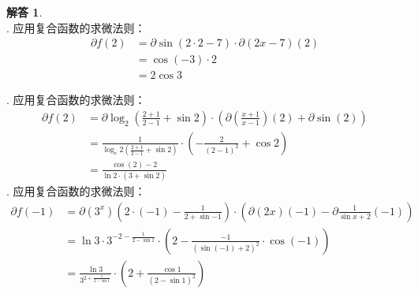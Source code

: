 \documentclass[12pt,UTF8]{ctexbook}
\theoremstyle{definition}
\newtheorem*{so}{解答}
\theoremstyle{plain}
\begin{document}
\begin{so}
    \mbox{} \\
    . 应用复合函数的求微法则：
    \begin{align*}
        \partial f(2) &= \partial \sin (2 \cdot 2 - 7) \cdot \partial (2x - 7) (2)  \\
        &= \cos{(-3)} \cdot 2  \\
        &= 2 \cos{3}   
    \end{align*}
    
    . 应用复合函数的求微法则：
    \begin{align*}
        \partial f(2) &= \partial \log_2 \left(\frac{2+1}{2-1} + \sin{2}\right) \cdot \left(\partial \left(\frac{x+1}{x-1}\right) (2) + \partial \sin (2) \right) \\
        &= \frac{1}{\log_e{2} \left(\frac{2+1}{2-1} + \sin{2}\right)} \cdot \left( -\frac{2}{(2 - 1)^2} + \cos{2} \right)  \\
        &= \frac{\cos{(2)} - 2}{\ln{2} \cdot (3 + \sin{2})}   
    \end{align*}
    . 应用复合函数的求微法则：
    \begin{align*}
        \partial f(-1) &= \partial (3^x) (2\cdot (-1) - \frac{1}{2 + \sin{-1}}) \cdot \left(\partial (2x) (-1) - \partial \frac{1}{\sin{x} + 2} (-1) \right)  \\
        &= \ln{3} \cdot 3^{-2 - \frac{1}{2 - \sin{1}}} \cdot \left(2 - \frac{-1}{(\sin{(-1)} + 2)^2} \cdot \cos{(-1)} \right)  \\
        &= \frac{\ln{3}}{3^{2 + \frac{1}{2 - \sin{1}}}} \cdot \left(2 + \frac{\cos{1}}{(2 - \sin{1})^2}\right)  
    \end{align*}

\end{so}
\end{document}
